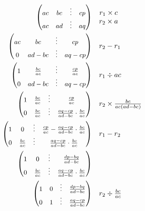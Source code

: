 \documentclass[../main]{subfiles}
\begin{document}
\begin{align}
    \PMat{ac&bc&\vdots&cp\\ac&ad&\vdots&aq} &
    \quad \begin{matrix}
        r_1\times c\\r_2\times a
    \end{matrix} \\
    \PMat{ac&bc&\vdots&cp\\0&ad-bc&\vdots&aq-cp} &
    \quad \begin{matrix}
        r_2-r_1
    \end{matrix} \\
    \PMat{1&\frac{bc}{ac}&\vdots&\frac{cp}{ac}\\0&ad-bc&\vdots&aq-cp} &
    \quad \begin{matrix}
        r_1\div ac
    \end{matrix} \\
    \PMat{1&\frac{bc}{ac}&\vdots&\frac{cp}{ac}\\0&\frac{bc}{ac}&\vdots&\frac{aq-cp}{ad-bc}\cdot\frac{bc}{ac}} &
    \quad \begin{matrix}
        r_2\times \frac{bc}{ac(ad-bc)}
    \end{matrix} \\
    \PMat{1&0&\vdots&\frac{cp}{ac}-\frac{aq-cp}{ad-bc}\cdot\frac{bc}{ac}\\0&\frac{bc}{ac}&\vdots&\frac{aq-cp}{ad-bc}\cdot\frac{bc}{ac}} &
    \quad \begin{matrix}
        r_1-r_2
    \end{matrix} \\
    \PMat{1&0&\vdots&\frac{dp-bq}{ad-bc}\\0&\frac{bc}{ac}&\vdots&\frac{aq-cp}{ad-bc}\cdot\frac{bc}{ac}} &
    \quad \begin{matrix}
    \end{matrix} \\
    \PMat{1&0&\vdots&\frac{dp-bq}{ad-bc}\\0&1&\vdots&\frac{aq-cp}{ad-bc}} &
    \quad \begin{matrix}
        r_2\div \frac{bc}{ac}
    \end{matrix}
\end{align}
\end{document}
